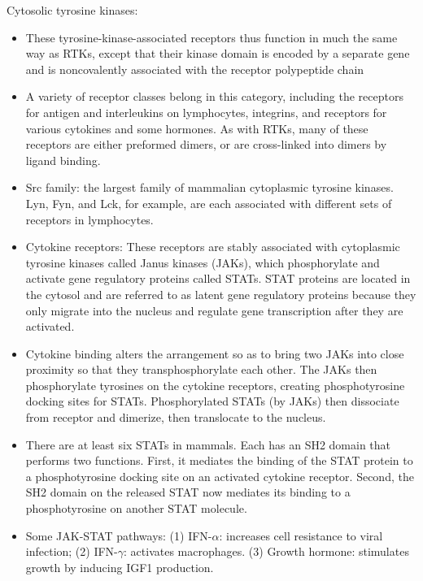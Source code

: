 \documentclass{report}
\begin{document}
\begin{enumerate}
Cytosolic tyrosine kinases: 
\begin{itemize}
\item These tyrosine-kinase-associated receptors thus function in much the same way as RTKs, except that their kinase domain is encoded by a separate gene and is noncovalently associated with the receptor polypeptide chain
\item A variety of receptor classes belong in this category, including the receptors for antigen and interleukins on lymphocytes, integrins, and receptors for various cytokines and some hormones. As with RTKs, many of these receptors are either preformed dimers, or are cross-linked into dimers by ligand binding. 
\item Src family: the largest family of mammalian cytoplasmic tyrosine kinases. Lyn, Fyn, and Lck, for example, are each associated with different sets of receptors in lymphocytes. 
\item Cytokine receptors: These receptors are stably associated with cytoplasmic tyrosine kinases called Janus kinases (JAKs), which phosphorylate and activate gene regulatory proteins called STATs. STAT proteins are located in the cytosol and are referred to as latent gene regulatory proteins because they only migrate into the nucleus and regulate gene transcription after they are activated.
\item Cytokine binding alters the arrangement so as to bring two JAKs into close proximity so that they transphosphorylate each other. The JAKs then phosphorylate tyrosines on the cytokine receptors, creating phosphotyrosine docking sites for STATs. Phosphorylated STATs (by JAKs) then dissociate from receptor and dimerize, then translocate to the nucleus. 
\item There are at least six STATs in mammals. Each has an SH2 domain that performs two functions. First, it mediates the binding of the STAT protein to a phosphotyrosine docking site on an activated cytokine receptor. Second, the SH2 domain on the released STAT now mediates its binding to a phosphotyrosine on another STAT molecule. 
\item Some JAK-STAT pathways: (1) IFN-$\alpha$: increases cell resistance to viral infection; (2) IFN-$\gamma$: activates macrophages. (3) Growth hormone: stimulates growth by inducing IGF1 production. 
\end{itemize}


\end{enumerate}
\end{document}
